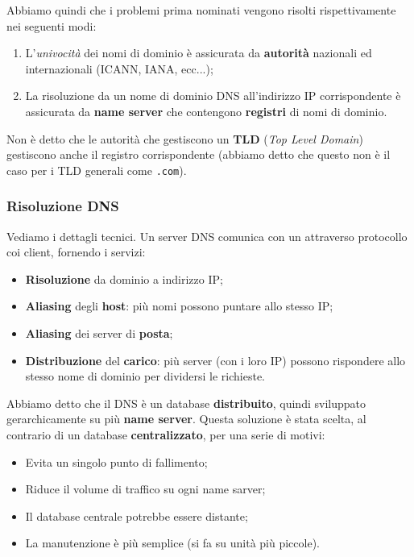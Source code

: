 \documentclass[a4paper,11pt]{article}
\begin{document}
Abbiamo quindi che i problemi prima nominati vengono risolti rispettivamente nei seguenti modi:
\begin{enumerate}
	\item L'\textit{univocità} dei nomi di dominio è assicurata da \textbf{autorità} nazionali ed internazionali (ICANN, IANA, ecc...);
	\item La risoluzione da un nome di dominio DNS all'indirizzo IP corrispondente è assicurata da \textbf{name server} che contengono \textbf{registri} di nomi di dominio.
\end{enumerate}

Non è detto che le autorità che gestiscono un \textbf{TLD} (\textit{Top Level Domain}) gestiscono anche il registro corrispondente (abbiamo detto che questo non è il caso per i TLD generali come \lstinline|.com|).

\subsubsection{Risoluzione DNS}
Vediamo i dettagli tecnici.
Un server DNS comunica con un attraverso protocollo coi client, fornendo i servizi:
\begin{itemize}
	\item \textbf{Risoluzione} da dominio a indirizzo IP;
	\item \textbf{Aliasing} degli \textbf{host}: più nomi possono puntare allo stesso IP;
	\item \textbf{Aliasing} dei server di \textbf{posta};
	\item \textbf{Distribuzione} del \textbf{carico}: più server (con i loro IP) possono rispondere allo stesso nome di dominio per dividersi le richieste.
\end{itemize}

Abbiamo detto che il DNS è un database \textbf{distribuito}, quindi sviluppato gerarchicamente su più \textbf{name server}.
Questa soluzione è stata scelta, al contrario di un database \textbf{centralizzato}, per una serie di motivi:
\begin{itemize}
	\item Evita un singolo punto di fallimento;
	\item Riduce il volume di traffico su ogni name sarver;
	\item Il database centrale potrebbe essere distante;
	\item La manutenzione è più semplice (si fa su unità più piccole).
\end{itemize}
\end{document}
